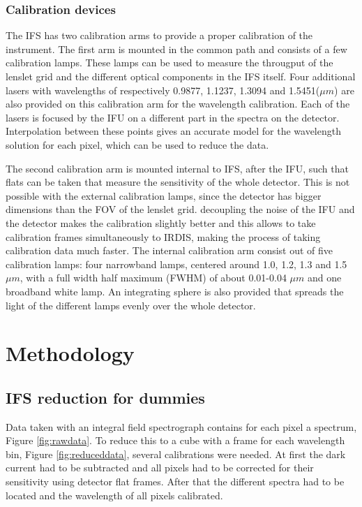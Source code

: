 \documentclass[twoside,single]{lion-msc}
\begin{document}
\subsection{Calibration devices}
The IFS has two calibration arms to provide a proper calibration of the instrument. The first arm is mounted in the common path and consists of a few calibration lamps. These lamps can be used to measure the througput of the lenslet grid and the different optical components in the IFS itself. Four additional lasers with wavelengths of respectively 0.9877, 1.1237, 1.3094 and 1.5451($\mu m$) are also provided on this calibration arm for the wavelength calibration. Each of the lasers is focused by the IFU on a different part in the spectra on the detector. Interpolation between these points gives an accurate model for the wavelength solution for each pixel, which can be used to reduce the data.
\bigskip

The second calibration arm is mounted internal to IFS, after the IFU, such that flats can be taken that measure the sensitivity of the whole detector. This is not possible with the external calibration lamps, since the detector has bigger dimensions than the FOV of the lenslet grid. decoupling the noise of the IFU and the detector makes the calibration slightly better and this allows to take calibration frames simultaneously to IRDIS, making the process of taking calibration data much faster. The internal calibration arm consist out of five calibration lamps: four narrowband lamps, centered around 1.0, 1.2, 1.3 and 1.5 $\mu m$, with a full width half maximum (FWHM) of about 0.01-0.04 $\mu m$ and one broadband white lamp\citep{Desidera}. An integrating sphere is also provided that spreads the light of the different lamps evenly over the whole detector.

\chapter{Methodology}
\section{IFS reduction for dummies}
Data taken with an integral field spectrograph contains for each pixel a spectrum, Figure \ref{fig:rawdata}. To reduce this to a cube with a frame for each wavelength bin, Figure \ref{fig:reduceddata}, several calibrations were needed. At first the dark current had to be subtracted and all pixels had to be corrected for their sensitivity using detector flat frames. After that the different spectra had to be located and the wavelength of all pixels calibrated. 
\end{document}
